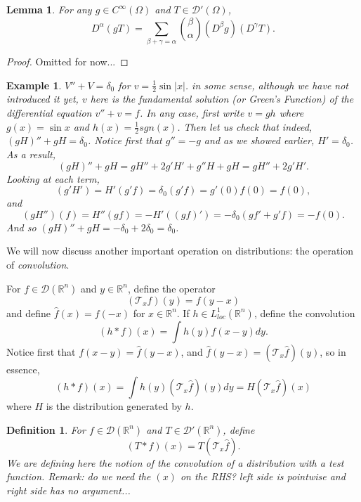 \documentclass[letterpaper,twoside,11pt]{article}
\theoremstyle{mystyle}
\newtheorem{definition}{Definition}[section]
\newtheorem{lemma}[theorem]{Lemma}
\newtheorem*{example}{Example}
\newcommand{\R}{{\mathbb R}}
\newcommand{\DD}{\mathcal D}
\newcommand{\cg}{\color{gray}}
\newcommand{\cbk}{\color{black}}
\begin{document}
\begin{lemma}
  For any $g \in C^\infty(\Omega)$ and $T \in \DD'(\Omega)$, 
  \[D^\alpha(gT) = \sum_{\beta+\gamma=\alpha} \binom{\beta}{\alpha} (D^\beta g)(D^\gamma T).\]
\end{lemma}
\begin{proof}
  Omitted for now...
\end{proof}
\begin{example}
  $V'' + V = \delta_0$ for $v = \frac{1}{2}\sin |x|$.  
  \cg in some sense, although we have not introduced it yet, $v$ here is the fundamental solution (or Green's Function) of the differential equation $v'' + v = f$.\cbk 
  In any case, first write $v = gh$ where $g(x) = \sin x$ and $h(x) = \frac{1}{2}sgn(x)$. Then let us check that indeed, $(gH)'' + gH = \delta_0$. Notice first that $g'' = -g$ and as we showed earlier, $H' = \delta_0$. As a result, 
  \[(gH)'' + gH = gH'' + 2g'H' + g''H + gH = gH'' + 2g'H' .\]
  Looking at each term, 
  \[\left( g'H' \right) = H'\left( g'f \right) = \delta_0 \left( g'f \right) =g'(0) f(0) = f(0),\]
  and 
  \[ \left( gH'' \right) (f) = H''(gf) = -H'\left( \left( gf \right)' \right) = -\delta_0(gf' + g'f) = -f(0).\]
  And so $\left( gH \right)'' + gH = -\delta_0 + 2\delta_0 = \delta_0$. 
  \end{example}

  We will now discuss another important operation on distributions: the operation of \textit{convolution}. 

  For $f \in \DD(\R^n)$ and $ y \in \R^n$, define the operator 
  \[\left( \mathcal{T}_xf \right)(y) = f(y-x)\]
  and define $\hat{f}(x) = f(-x)$ for $x \in \R^n$. If $h \in L^1_{loc}(\R^n)$, define the convolution 
  \[\left( h\ast f \right) (x) = \int h(y) f(x-y) dy.\]
  Notice first that $f(x-y) = \hat{f}(y-x)$, and $\hat f(y-x) =\left( \mathcal T_x \hat f \right)(y)$, so in essence, 
  \[\left( h\ast f  \right) (x) = \int h(y) \left( \mathcal T_x \hat f \right)  (y) dy = H\left( \mathcal T_x \hat f \right) (x) \]
  where $H$ is the distribution generated by $h$. 

  \begin{definition}
    For $f \in \DD(\R^n)$ and $T \in \DD'(\R^n)$, define 
    \[\left( T\ast f  \right)(x) = T\left( \mathcal T_x \hat f \right).\]
    \cg We are defining here the notion of the convolution of a distribution with a test function. Remark: do we need the $(x)$ on the RHS? left side is pointwise and right side has no argument...\cbk 
  \end{definition}
\end{document}
